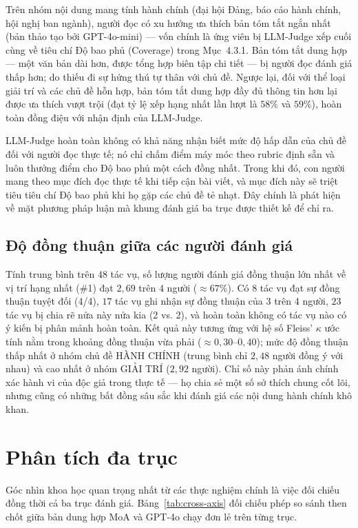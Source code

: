 Trên nhóm nội dung mang tính hành chính (đại hội Đảng, báo cáo hành chính, hội nghị ban ngành), người đọc có xu hướng ưa thích bản tóm tắt ngắn nhất (bản thảo tạo bởi GPT-4o-mini) --- vốn chính là ứng viên bị LLM-Judge xếp cuối cùng về tiêu chí Độ bao phủ (Coverage) trong Mục~4.3.1. Bản tóm tắt dung hợp --- một văn bản dài hơn, được tổng hợp biên tập chi tiết --- bị người đọc đánh giá thấp hơn; do thiếu đi sự hứng thú tự thân với chủ đề. Ngược lại, đối với thể loại giải trí và các chủ đề hỗn hợp, bản tóm tắt dung hợp đầy đủ thông tin hơn lại được ưa thích vượt trội (đạt tỷ lệ xếp hạng nhất lần lượt là $58\%$ và $59\%$), hoàn toàn đồng điệu với nhận định của LLM-Judge.

LLM-Judge hoàn toàn không có khả năng nhận biết mức độ hấp dẫn của chủ đề đối với người đọc thực tế; nó chỉ chấm điểm máy móc theo rubric định sẵn và luôn thưởng điểm cho Độ bao phủ một cách đồng nhất. Trong khi đó, con người mang theo mục đích đọc thực tế khi tiếp cận bài viết, và mục đích này sẽ triệt tiêu tiêu chí Độ bao phủ khi họ gặp các chủ đề tẻ nhạt. Đây chính là phát hiện về mặt phương pháp luận mà khung đánh giá ba trục được thiết kế để chỉ ra.

\subsection{Độ đồng thuận giữa các người đánh giá}

Tính trung bình trên $48$ tác vụ, số lượng người đánh giá đồng thuận lớn nhất về vị trí hạng nhất (\#1) đạt $2{,}69$ trên $4$ người ($\approx 67\%$). Có 8 tác vụ đạt sự đồng thuận tuyệt đối (4/4), $17$ tác vụ ghi nhận sự đồng thuận của 3 trên 4 người, $23$ tác vụ bị chia rẽ nửa này nửa kia (2 vs. 2), và hoàn toàn không có tác vụ nào có ý kiến bị phân mảnh hoàn toàn. Kết quả này tương ứng với hệ số Fleiss' $\kappa$ ước tính nằm trong khoảng đồng thuận vừa phải ($\approx 0{,}30$--$0{,}40$); mức độ đồng thuận thấp nhất ở nhóm chủ đề HÀNH CHÍNH (trung bình chỉ $2{,}48$ người đồng ý với nhau) và cao nhất ở nhóm GIẢI TRÍ ($2{,}92$ người). Chỉ số này phản ánh chính xác hành vi của độc giả trong thực tế --- họ chia sẻ một số sở thích chung cốt lõi, nhưng cũng có những bất đồng sâu sắc khi đánh giá các nội dung hành chính khô khan.

\section{Phân tích đa trục}

Góc nhìn khoa học quan trọng nhất từ các thực nghiệm chính là việc đối chiếu đồng thời cả ba trục đánh giá. Bảng~\ref{tab:cross-axis} đối chiếu phép so sánh then chốt giữa bản dung hợp MoA và GPT-4o chạy đơn lẻ trên từng trục.

